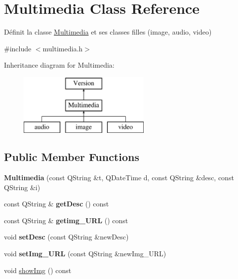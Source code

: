 \hypertarget{class_multimedia}{}\section{Multimedia Class Reference}
\label{class_multimedia}


Définit la classe \hyperlink{class_multimedia}{Multimedia} et ses classes filles (image, audio, video)  




{\ttfamily \#include $<$multimedia.\+h$>$}

Inheritance diagram for Multimedia\+:\begin{figure}[H]
\begin{center}
\leavevmode
\includegraphics[height=3.000000cm]{class_multimedia}
\end{center}
\end{figure}
\subsection*{Public Member Functions}
\begin{DoxyCompactItemize}
\item 
\mbox{\label{class_multimedia_ae51e2ff4de8074f01ddd7806d3ee123b}} 
{\bfseries Multimedia} (const Q\+String \&t, Q\+Date\+Time d, const Q\+String \&desc, const Q\+String \&i)
\item 
\mbox{\label{class_multimedia_a5036bb76fb0e9e0fc30fab727c2153bf}} 
const Q\+String \& {\bfseries get\+Desc} () const
\item 
\mbox{\label{class_multimedia_a8b55367c43e2ce9d450f9592201d3ffe}} 
const Q\+String \& {\bfseries getimg\+\_\+\+U\+RL} () const
\item 
\mbox{\label{class_multimedia_adf3ef3a343c056e8c07b8715a0997735}} 
void {\bfseries set\+Desc} (const Q\+String \&new\+Desc)
\item 
\mbox{\label{class_multimedia_a8f259550cd3078df95fcd8323d598632}} 
void {\bfseries set\+Img\+\_\+\+U\+RL} (const Q\+String \&new\+Img\+\_\+\+U\+RL)
\item 
void \hyperlink{class_multimedia_ac9c5f340806cbf1b93e8268c5c28ff92}{show\+Img} () const
\end{DoxyCompactItemize}


